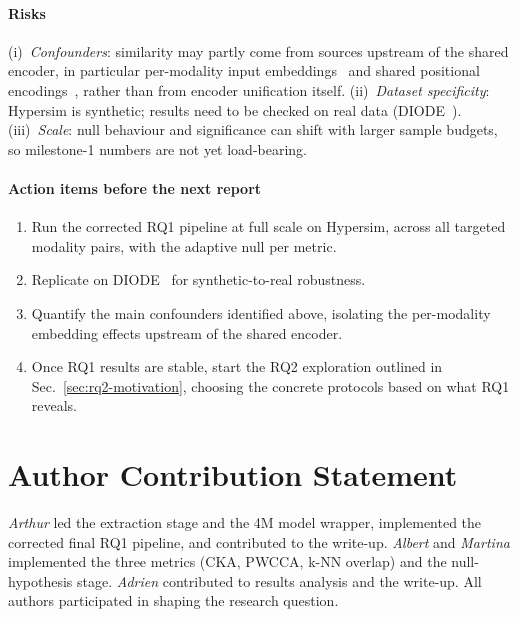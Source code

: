\documentclass[10pt,conference,compsocconf]{IEEEtran}
\begin{document}
\paragraph{Risks}
(i)~\emph{Confounders}: similarity may partly come from sources
upstream of the shared encoder, in particular per-modality input
embeddings~\cite{4m} and shared positional encodings~\cite{transformer},
rather than from encoder unification itself.
(ii)~\emph{Dataset specificity}: Hypersim is synthetic; results need to
be checked on real data (DIODE~\cite{diode}).
(iii)~\emph{Scale}: null behaviour and significance can shift with
larger sample budgets, so milestone-1 numbers are not yet
load-bearing.

\paragraph{Action items before the next report}
\begin{enumerate}\itemsep0pt
  \item Run the corrected RQ1 pipeline at full scale on Hypersim,
        across all targeted modality pairs, with the adaptive null
        per metric.
  \item Replicate on DIODE~\cite{diode} for synthetic-to-real
        robustness.
  \item Quantify the main confounders identified above, isolating the
        per-modality embedding effects upstream of the shared encoder.
  \item Once RQ1 results are stable, start the RQ2 exploration
        outlined in Sec.~\ref{sec:rq2-motivation}, choosing the
        concrete protocols based on what RQ1 reveals.
\end{enumerate}

\section{Author Contribution Statement}
\textit{Arthur} led the extraction stage and the 4M model wrapper,
implemented the corrected final RQ1 pipeline, and contributed to the
write-up. \textit{Albert} and \textit{Martina} implemented the three
metrics (CKA, PWCCA, k-NN overlap) and the null-hypothesis stage.
\textit{Adrien} contributed to results analysis and the write-up. All
authors participated in shaping the research question.



\end{document}
